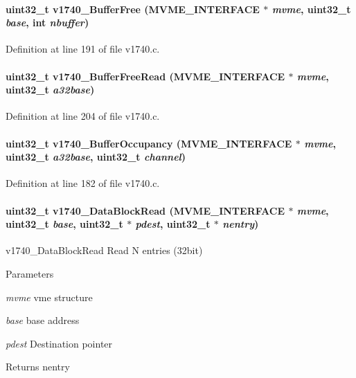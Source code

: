 \paragraph[{v1740\_\-BufferFree}]{\setlength{\rightskip}{0pt plus 5cm}uint32\_\-t v1740\_\-BufferFree ({\bf MVME\_\-INTERFACE} $\ast$ {\em mvme}, \/  uint32\_\-t {\em base}, \/  int {\em nbuffer})}\hfill\label{v1740drv_8h_aac2f1a0ff0d9d81afe98cfe0f6837c45}


Definition at line 191 of file v1740.c.
\paragraph[{v1740\_\-BufferFreeRead}]{\setlength{\rightskip}{0pt plus 5cm}uint32\_\-t v1740\_\-BufferFreeRead ({\bf MVME\_\-INTERFACE} $\ast$ {\em mvme}, \/  uint32\_\-t {\em a32base})}\hfill\label{v1740drv_8h_a9a0c9bb6f67b76de3f955a4419cd99fb}


Definition at line 204 of file v1740.c.
\paragraph[{v1740\_\-BufferOccupancy}]{\setlength{\rightskip}{0pt plus 5cm}uint32\_\-t v1740\_\-BufferOccupancy ({\bf MVME\_\-INTERFACE} $\ast$ {\em mvme}, \/  uint32\_\-t {\em a32base}, \/  uint32\_\-t {\em channel})}\hfill\label{v1740drv_8h_a54a497d64719bf5eeb1e2faa557d40f7}


Definition at line 182 of file v1740.c.
\paragraph[{v1740\_\-DataBlockRead}]{\setlength{\rightskip}{0pt plus 5cm}uint32\_\-t v1740\_\-DataBlockRead ({\bf MVME\_\-INTERFACE} $\ast$ {\em mvme}, \/  uint32\_\-t {\em base}, \/  uint32\_\-t $\ast$ {\em pdest}, \/  uint32\_\-t $\ast$ {\em nentry})}\hfill\label{v1740drv_8h_ac188fa4c584e5e969ee1d37592d0ba62}
v1740\_\-DataBlockRead Read N entries (32bit) 
\begin{DoxyParams}{Parameters}
\item[{\em mvme}]vme structure \item[{\em base}]base address \item[{\em pdest}]Destination pointer \end{DoxyParams}
\begin{DoxyReturn}{Returns}
nentry 
\end{DoxyReturn}


